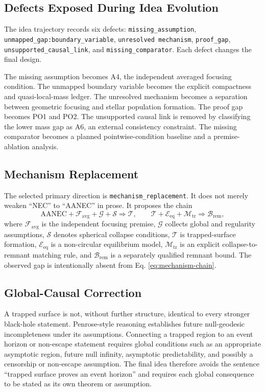\documentclass[conference]{IEEEtran}
\newcommand{\AANEC}{\mathrm{AANEC}}
\begin{document}
\subsection{Defects Exposed During Idea Evolution}
The idea trajectory records six defects: \texttt{missing\_assumption}, \texttt{unmapped\_gap:boundary\_variable}, \texttt{unresolved mechanism}, \texttt{proof\_gap}, \texttt{unsupported\_causal\_link}, and \texttt{missing\_comparator}. Each defect changes the final design.

The missing assumption becomes A4, the independent averaged focusing condition. The unmapped boundary variable becomes the explicit compactness and quasi-local-mass ledger. The unresolved mechanism becomes a separation between geometric focusing and stellar population formation. The proof gap becomes PO1 and PO2. The unsupported causal link is removed by classifying the lower mass gap as A6, an external consistency constraint. The missing comparator becomes a planned pointwise-condition baseline and a premise-ablation analysis.

\subsection{Mechanism Replacement}
The selected primary direction is \texttt{mechanism\_replacement}. It does not merely weaken ``NEC'' to ``AANEC'' in prose. It proposes the chain
\begin{equation}
\AANEC+\mathcal{F}_{\mathrm{avg}}+\mathcal{G}+\mathcal{S}
\Longrightarrow \mathcal{T},
\qquad
\mathcal{T}+\mathcal{E}_{\mathrm{eq}}+\mathcal{M}_{\mathrm{tr}}
\Longrightarrow \mathcal{B}_{\mathrm{rem}},
\label{eq:mechanism-chain}
\end{equation}
where $\mathcal{F}_{\mathrm{avg}}$ is the independent focusing premise, $\mathcal{G}$ collects global and regularity assumptions, $\mathcal{S}$ denotes spherical collapse conditions, $\mathcal{T}$ is trapped-surface formation, $\mathcal{E}_{\mathrm{eq}}$ is a non-circular equilibrium model, $\mathcal{M}_{\mathrm{tr}}$ is an explicit collapse-to-remnant matching rule, and $\mathcal{B}_{\mathrm{rem}}$ is a separately qualified remnant bound. The observed gap is intentionally absent from Eq. \eqref{eq:mechanism-chain}.

\subsection{Global-Causal Correction}
A trapped surface is not, without further structure, identical to every stronger black-hole statement. Penrose-style reasoning establishes future null-geodesic incompleteness under its assumptions. Connecting a trapped region to an event horizon or non-escape statement requires global conditions such as an appropriate asymptotic region, future null infinity, asymptotic predictability, and possibly a censorship or non-escape assumption. The final idea therefore avoids the sentence ``trapped surface proves an event horizon'' and requires each global consequence to be stated as its own theorem or assumption.
\end{document}
